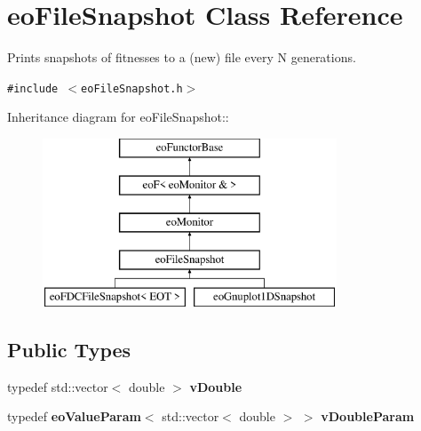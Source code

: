 \section{eo\-File\-Snapshot Class Reference}
\label{classeo_file_snapshot}
Prints snapshots of fitnesses to a (new) file every N generations.  


{\tt \#include $<$eo\-File\-Snapshot.h$>$}

Inheritance diagram for eo\-File\-Snapshot::\begin{figure}[H]
\begin{center}
\leavevmode
\includegraphics[height=5cm]{classeo_file_snapshot}
\end{center}
\end{figure}
\subsection*{Public Types}
\begin{CompactItemize}
\item 
typedef std::vector$<$ double $>$ {\bf v\-Double}\label{classeo_file_snapshot_w0}

\item 
typedef {\bf eo\-Value\-Param}$<$ std::vector$<$ double $>$ $>$ {\bf v\-Double\-Param}\label{classeo_file_snapshot_w1}

\end{CompactItemize}
